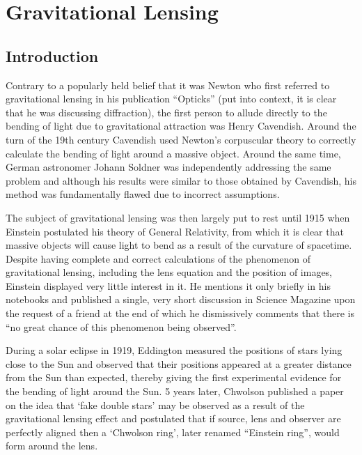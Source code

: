 
\section{Gravitational Lensing} %
\label{sec:gravitational_lensing}

	\subsection{Introduction} %
	\label{sub:introduction}
		Contrary to a popularly held belief that it was Newton who first referred to gravitational lensing in his publication ``Opticks''\cite{Newton_Opticks} (put into context, it is clear that he was discussing diffraction), the first person to allude directly to the bending of light due to gravitational attraction was Henry Cavendish. Around the turn of the 19th century Cavendish used Newton's corpuscular theory to correctly calculate the bending of light around a massive object.  Around the same time, German astronomer Johann Soldner was independently addressing the same problem\cite{Soldner} and although his results were similar to those obtained by Cavendish, his method was fundamentally flawed due to incorrect assumptions\cite{Conceptual_origins_of_GL}.

		The subject of gravitational lensing was then largely put to rest until 1915 when Einstein postulated his theory of General Relativity, from which it is clear that massive objects will cause light to bend as a result of the curvature of spacetime. Despite having complete and correct calculations of the phenomenon of gravitational lensing, including the lens equation and the position of images, Einstein displayed very little interest in it. He mentions it only briefly in his notebooks and published a single, very short discussion in Science Magazine upon the request of a friend at the end of which he dismissively comments that there is ``no great chance of this phenomenon being observed''\cite{Einstein_science_magazine}.

		During a solar eclipse in 1919, Eddington measured the positions of stars lying close to the Sun and observed that their positions appeared at a greater distance from the Sun than expected, thereby giving the first experimental evidence for the bending of light around the Sun\cite{Eddington_GL_evidence}. 5 years later, Chwolson published a paper on the idea that `fake double stars' may be observed as a result of the gravitational lensing effect and postulated that if source, lens and observer are perfectly aligned then a `Chwolson ring', later renamed ``Einstein ring'', would form around the lens\cite{Conceptual_origins_of_GL}.


